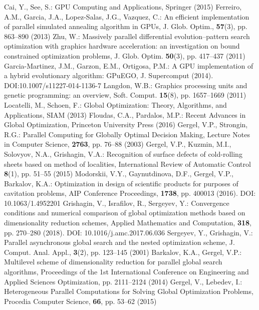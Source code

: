 \documentclass[runningheads]{llncs}
\begin{document}
\begin{thebibliography}{8}
	Cai, Y., See, S.: GPU Computing and Applications,  Springer (2015) 
	Ferreiro, A.M., Garcia, J.A., Lopez-Salas, J.G., Vazquez, C.: An efficient implementation of parallel simulated annealing algorithm in GPUs,  J. Glob. Optim., \textbf{57}(3), pp. 863--890 (2013)
	Zhu, W.: Massively parallel differential evolution--pattern search optimization with graphics hardware acceleration: an investigation on bound constrained optimization problems,  J. Glob. Optim. \textbf{50}(3), pp. 417--437 (2011)
	Garcia-Martinez, J.M., Garzon, E.M., Ortigosa, P.M.: A GPU implementation of a hybrid evolutionary algorithm: GPuEGO,  J. Supercomput (2014). DOI:10.1007/s11227-014-1136-7
	Langdon, W.B.: Graphics processing units and genetic programming: an overview,  Soft. Comput. \textbf{15}(8), pp. 1657--1669 (2011)
	Locatelli, M., Schoen, F.: Global Optimization: Theory, Algorithms, and Applications,  SIAM (2013)
	Floudas, C.A., Pardalos, M.P.: Recent Advances in Global Optimization,  Princeton University Press (2016)
	Gergel, V.P., Strongin, R.G.: Parallel Computing for Globally Optimal Decision Making,  Lecture Notes in Computer Science, \textbf{2763}, pp. 76--88 (2003)
	Gergel, V.P., Kuzmin, M.I., Solovyov, N.A., Grishagin, V.A.: Recognition of surface defects of cold-rolling sheets based on method of localities,  International Review of Automatic Control \textbf{8}(1), pp. 51--55 (2015)
	Modorskii, V.Y., Gaynutdinova, D.F., Gergel, V.P., Barkalov, K.A.: Optimization in design of scientific products for purposes of cavitation problems,  AIP Conference Proceedings, \textbf{1738}, pp. 400013 (2016). DOI: 10.1063/1.4952201
 Grishagin, V., Israfilov, R., Sergeyev, Y.: Convergence conditions and numerical comparison of global optimization methods based on dimensionality reduction schemes,  Applied Mathematics and Computation, \textbf{318}, pp. 270--280 (2018). DOI: 10.1016/j.amc.2017.06.036
	Sergeyev, Y., Grishagin, V.: Parallel asynchronous global search and the nested optimization scheme,  J. Comput. Anal. Appl., \textbf{3}(2), pp. 123--145 (2001)
	Barkalov, K.A., Gergel, V.P.: Multilevel scheme of dimensionality reduction for parallel global search algorithms,  Proceedings of the 1st International Conference on Engineering and Applied Sciences Optimization, pp. 2111--2124 (2014)
 Gergel, V., Lebedev, I.: Heterogeneous Parallel Computations for Solving Global Optimization Problems,  Procedia Computer Science, \textbf{66}, pp. 53--62 (2015)

\end{thebibliography}
\end{document}
